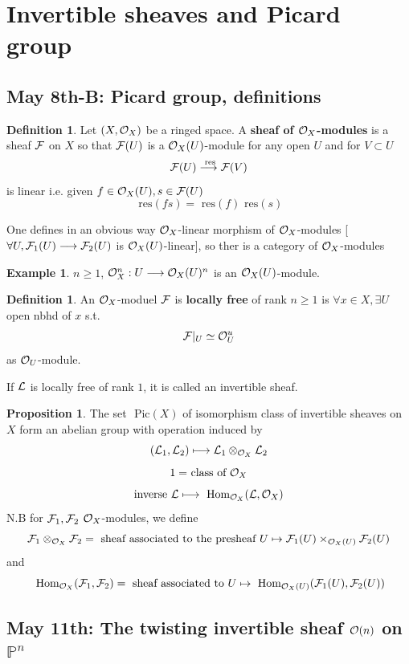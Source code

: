 \documentclass[11pt]{article}
\theoremstyle{definition}
\newtheorem{prop}[thm]{Proposition}
\newtheorem{dfn}[thm]{Definition}
\newtheorem{ex}[thm]{Example}
\renewcommand{\hom}{\text{ Hom}}
\newcommand{\pic}{\text{ Pic}}
\newcommand{\res}{\text{ res}}
\newcommand{\proj}{\mathbb P}
\newcommand{\calf}{{\cal F}}
\newcommand{\call}{{\cal L}}
\newcommand{\calo}{{\cal O}}
\newcommand{\lrta}{\longrightarrow}
\begin{document}
\section{Invertible sheaves and Picard group}
\subsection{May 8th-B: Picard group, definitions}
\begin{dfn}
Let $(X,\calo_X)$ be a ringed space. A \textbf{sheaf of $\calo_X$-modules} is a sheaf
$\calf$ on $X$ so that $\calf(U)$ is a $\calo_X(U)$-module for any open $U$ and for $V\subset U$
$$
\calf(U)\overset{\res}{\lrta}\calf(V)
$$
is linear i.e. given $f\in \calo_X(U), s\in \calf(U)$
$$
\res (f s)=\res(f)\res(s)
$$
\end{dfn}

One defines in an obvious way $\calo_X$-linear morphism of $\calo_X$-modules
[$\forall U, \calf_1(U)\lrta\calf_2(U)$ is $\calo_X(U)$-linear], so ther is a category of $\calo_X$-modules
\begin{ex}
$n\geq 1$, $\calo_X^n:U\lrta \calo_X(U)^n$ is an $\calo_X(U)$-module. 
\end{ex}
\begin{dfn}
An $\calo_X$-moduel $\calf$ is \textbf{locally free} of rank $n\geq 1$ is $\forall x\in X,\exists U $ open nbhd of $x $ s.t.
$$
\calf|_U\simeq \calo_U^u
$$
as $\calo_U$-module.
\end{dfn}

If $\call$ is  locally free of rank $1$, it is called an invertible sheaf.
\begin{prop}
The set $\pic(X)$ of isomorphism class of invertible sheaves on $X$ form  an abelian group with operation induced by 
$$
(\call_1,\call_2)\longmapsto \call_1\otimes_{\calo_X}\call_2
$$
$$
\text{$1=$ class of $\calo_X$}
$$
$$
\text{inverse }
\call\longmapsto \hom_{\calo_X}(\call,\calo_X)
$$
N.B for $\calf_1,\calf_2$ $\calo_X$-modules, we define
$$
\calf_1\otimes_{\calo_X}\calf_2=\text{ sheaf associated to  the presheaf $U\mapsto \calf_1(U)\times_{\calo_X(U)}\calf_2(U)$}
$$
and
$$
\hom_{\calo_X}(\calf_1,\calf_2)=\text{ sheaf associated to $U\mapsto \hom_{\calo_X(U)}(\calf_1(U),\calf_2(U))$}
$$
\end{prop}


\subsection{May 11th: The twisting invertible sheaf $\calo(n)$ on $\proj^n$}
\end{document}
